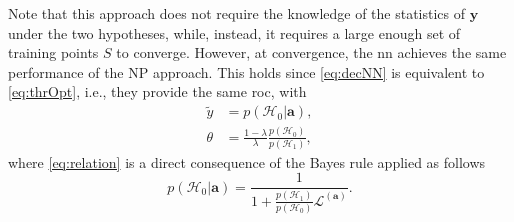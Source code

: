 \documentclass[conference,final]{IEEEtran}
\begin{document}
Note that this approach does not require the knowledge of the statistics of $\bm{y}$ under the two hypotheses, while, instead, it requires a large enough set of training points $S$ to converge.
However, at convergence, the \ac{nn} achieves the same performance of the NP approach. This holds since \eqref{eq:decNN} is equivalent to \eqref{eq:thrOpt}, i.e., they provide the same \ac{roc}, with
\begin{align}
	\tilde{y} &= p(\mathcal{H}_0|\bm a), \\
	\label{eq:relation}
	\theta &= \frac{1-\lambda}{\lambda} \frac{p(\mathcal{H}_0)}{p(\mathcal{H}_1)},	
\end{align}  
where \eqref{eq:relation} is a direct consequence of the Bayes rule applied as follows 
\begin{equation}
	p(\mathcal{H}_0| \bm a) = \frac{1}{1+  \frac{p(\mathcal{H}_1)}{p(\mathcal{H}_0)} \mathcal{L}^{(\bm a)}}.	
\end{equation}




\end{document}
